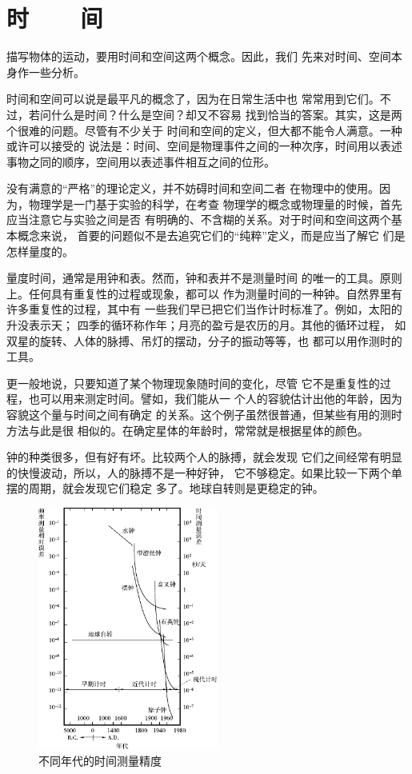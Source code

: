 \section[时间]{时~~~~间}\label{sec:01.01}

描写物体的运动，要用时间和空间这两个概念。因此，我们
先来对时间、空间本身作一些分析。

时间和空间可以说是最平凡的概念了，因为在日常生活中也
常常用到它们。不过，若问什么是时间？什么是空间？却又不容易
找到恰当的答案。其实，这是两个很难的问题。尽管有不少关于
时间和空间的定义，但大都不能令人满意。一种或许可以接受的
说法是：时间、空间是物理事件之间的一种次序，时间用以表述
事物之同的顺序，空间用以表述事件相互之间的位形。

没有满意的“严格”的理论定义，并不妨碍时间和空间二者
在物理中的使用。因为，物理学是一门基于实验的科学，在考查
物理学的概念或物理量的时候，首先应当注意它与实验之间是否
有明确的、不含糊的关系。对于时间和空间这两个基本概念来说，
首要的问题似不是去追究它们的“纯粹”定义，而是应当了解它
们是怎样量度的。

量度时间，通常是用钟和表。然而，钟和表并不是测量时间
的唯一的工具。原则上。任何具有重复性的过程或现象，都可以
作为测量时间的一种钟。自然界里有许多重复性的过程，其中有
一些我们早已把它们当作计时标准了。例如，太阳的升没表示天；
四季的循环称作年；月亮的盈亏是农历的月。其他的循环过程，
如双星的旋转、人体的脉搏、吊灯的摆动，分子的振动等等，也
都可以用作测时的工具。

更一般地说，只要知道了某个物理现象随时间的变化，尽管
它不是重复性的过程，也可以用来测定时间。譬如，我们能从一
个人的容貌估计出他的年龄，因为容貌这个量与时间之间有确定
的关系。这个例子虽然很普通，但某些有用的测时方法与此是很
相似的。在确定星体的年龄时，常常就是根据星体的颜色。

钟的种类很多，但有好有坏。比较两个人的脉搏，就会发现
它们之间经常有明显的快慢波动，所以，人的脉搏不是一种好钟，
它不够稳定。如果比较一下两个单摆的周期，就会发现它们稳定
多了。地球自转则是更稳定的钟。
\begin{figure}[!h]
  \centering
  \includegraphics[height=8cm]{figure/fig01.01}
  \caption{不同年代的时间测量精度}\label{fig:01.01}
\end{figure}

